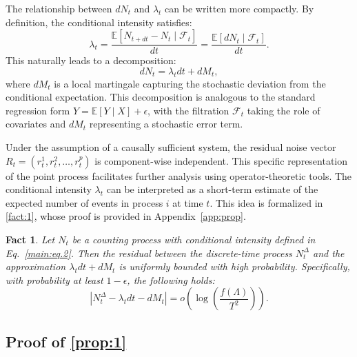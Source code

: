 \documentclass[10pt]{article}
\numberwithin{figure}{section}
\newtheorem{fact}{Fact}
\begin{document}
\begin{aremark}\label{armk:1}
The relationship between $dN_t$ and $\lambda_t$ can be written more compactly. By definition, the conditional intensity satisfies:
\[
\lambda_t = \frac{\mathbb{E}[N_{t+dt} - N_t \mid \mathcal{F}_t]}{dt} = \frac{\mathbb{E}[dN_t \mid \mathcal{F}_t]}{dt}.
\]
This naturally leads to a decomposition:
\[
dN_t = \lambda_t dt + dM_t,
\]
where $dM_t$ is a local martingale capturing the stochastic deviation from the conditional expectation. This decomposition is analogous to the standard regression form $Y = \mathbb{E}[Y \mid X] + \epsilon$, with the filtration $\mathcal{F}_t$ taking the role of covariates and $dM_t$ representing a stochastic error term.
\end{aremark}
Under the assumption of a causally sufficient system, the residual noise vector $R_t = (r^1_t, r^2_t, \dots, r^p_t)$ is component-wise independent. This specific representation of the point process facilitates further analysis using operator-theoretic tools. The conditional intensity $\lambda_t$ can be interpreted as a short-term estimate of the expected number of events in process $i$ at time $t$. This idea is formalized in \autoref{fact:1}, whose proof is provided in Appendix~\ref{app:prop}.

\begin{fact}\label{fact:1}
Let $N_t$ be a counting process with conditional intensity defined in Eq.~\eqref{main:eq.2}. Then the residual between the discrete-time process $N_t^\Delta$ and the approximation $\lambda_t dt + dM_t$ is uniformly bounded with high probability. Specifically, with probability at least $1 - \epsilon$, the following holds:
\[
\left|N_t^\Delta - \lambda_t dt - dM_t \right| = o\left(\log\left(\frac{f(\Lambda)}{T^2}\right)\right).
\]
\end{fact}

\subsection{Proof of \autoref{prop:1}}
\end{document}
